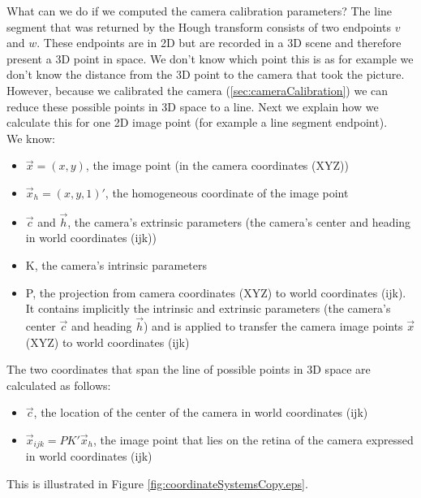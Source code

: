 	What can we do if we computed the camera calibration parameters?
	The line segment that was returned by the Hough transform consists of two
	endpoints $v$ and $w$. These endpoints are in 2D but are recorded in a 3D
	scene and therefore present a 3D point in space. We don't know which point
	this is as for example we don't know the distance from the 3D point to the camera that took
	the picture. 
	However, because we calibrated the camera (\ref{sec:cameraCalibration}) we
	can reduce these possible points in 3D space to a line. Next we explain how
	we calculate this for one 2D image point (for example a line segment endpoint).\\

	We know:
	\begin{itemize}
		\item $\vec{x} = (x,y)$, the image point (in the camera coordinates
		(XYZ))
		\item $\vec{x}_{h} = (x,y,1)'$, the homogeneous coordinate of the image point
		\item $\vec{c}$ and $\vec{h}$, the camera's extrinsic parameters (the
		camera's center and heading in world coordinates (ijk))
		\item K, the camera's intrinsic parameters
		\item P, the projection from camera coordinates (XYZ) to world
		coordinates (ijk). It contains implicitly the intrinsic and
		extrinsic parameters (the camera's center $\vec{c}$ and heading
		$\vec{h}$) and is applied to transfer the camera image points $\vec{x}$ (XYZ) to world
		coordinates (ijk)
	\end{itemize}

	The two coordinates that span the line of possible points in 3D space are
	calculated as follows:
	\begin{itemize}
		\item $\vec{c}$, the location of the center of the camera in 
		world coordinates (ijk)
		\item $\vec{x}_{ijk} = P K' \vec{x}_{h}$, the image point that lies on the retina of
		the camera expressed in world coordinates (ijk)\\
	\end{itemize}
	This is illustrated in Figure \ref{fig:coordinateSystemsCopy.eps}.

	\clearpage


